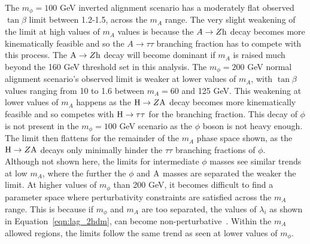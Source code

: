 The $m_{\phi} = 100$ GeV inverted alignment scenario has a moderately flat observed $\tan\beta$ limit between 1.2-1.5, across the $m_{A}$ range.
The very slight weakening of the limit at high values of $m_{A}$ values is because the $A\rightarrow Z{\text{h}}$ decay becomes more kinematically feasible and so the $A\rightarrow\tau\tau$ branching fraction has to compete with this process.
The ${\text{A}}\rightarrow Z{\text{h}}$ decay will become dominant if $m_{A}$ is raised much beyond the 160 GeV threshold set in this analysis.
The $m_{\phi} = 200$ GeV normal alignment scenario's observed limit is weaker at lower values of $m_{A}$, with $\tan\beta$ values ranging from 10 to 1.6 between $m_{A} = 60$ and 125 GeV.
This weakening at lower values of $m_{A}$ happens as the ${\text{H}}\rightarrow Z{\text{A}}$ decay becomes more kinematically feasible and so competes with ${\text{H}}\rightarrow\tau\tau$ for the branching fraction.
This decay of $\phi$ is not present in the $m_{\phi}=100$ GeV scenario as the $\phi$ boson is not heavy enough.
The limit then flattens for the remainder of the $m_{A}$ phase space shown, as the ${\text{H}}\rightarrow Z{\text{A}}$ decays only minimally hinder the $\tau\tau$ branching fractions of $\phi$. \\

Although not shown here, the limits for intermediate $\phi$ masses see similar trends at low $m_{A}$, where the further the $\phi$ and ${\text{A}}$ masses are separated the weaker the limit.
At higher values of $m_\phi$ than 200 GeV, it becomes difficult to find a parameter space where perturbativity constraints are satisfied across the $m_{A}$ range. 
This is because if $m_\phi$ and $m_{A}$ are too separated, the values of $\lambda_i$ as shown in Equation~\ref{eqn:lag_2hdm}, can become non-perturbative~\cite{Jueid:2021avn}.
Within the $m_{A}$ allowed regions, the limits follow the same trend as seen at lower values of $m_{\phi}$. \\

